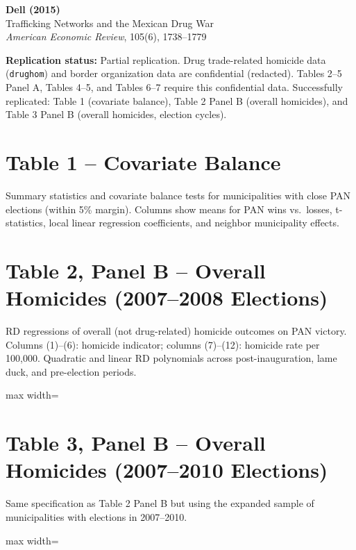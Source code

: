 \documentclass[12pt]{article}
\begin{document}
\begin{center}
{\Large\bfseries Dell (2015)}\\
{\large Trafficking Networks and the Mexican Drug War}\\
\vspace{0.5em}
{\normalsize \textit{American Economic Review}, 105(6), 1738--1779}
\end{center}

\vspace{1em}
\noindent\textbf{Replication status:} Partial replication.
Drug trade-related homicide data (\texttt{drughom}) and border organization data
are confidential (redacted). Tables 2--5 Panel A, Tables 4--5, and Tables 6--7
require this confidential data. Successfully replicated: Table 1 (covariate balance),
Table 2 Panel B (overall homicides), and Table 3 Panel B (overall homicides, election cycles).

\tableofcontents

\clearpage
\section{Table 1 -- Covariate Balance}

Summary statistics and covariate balance tests for municipalities with close PAN
elections (within 5\% margin). Columns show means for PAN wins vs.\ losses,
t-statistics, local linear regression coefficients, and neighbor municipality effects.



\clearpage
\section{Table 2, Panel B -- Overall Homicides (2007--2008 Elections)}

RD regressions of overall (not drug-related) homicide outcomes on PAN victory.
Columns (1)--(6): homicide indicator; columns (7)--(12): homicide rate per 100,000.
Quadratic and linear RD polynomials across post-inauguration, lame duck, and
pre-election periods.

\begin{adjustbox}{max width=\textwidth}

\end{adjustbox}

\clearpage
\section{Table 3, Panel B -- Overall Homicides (2007--2010 Elections)}

Same specification as Table 2 Panel B but using the expanded sample
of municipalities with elections in 2007--2010.

\begin{adjustbox}{max width=\textwidth}

\end{adjustbox}
\end{document}
